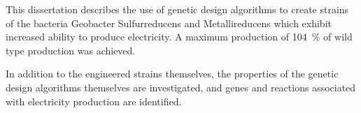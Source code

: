 This dissertation describes the use of genetic design algorithms to create strains of the bacteria Geobacter Sulfurreducens and Metallireducens which exhibit increased ability to produce electricity. 
A maximum production of \SI{104}{\percent} of wild type production was achieved.

In addition to the engineered strains themselves, the properties of the genetic design algorithms themselves are investigated, and genes and reactions associated with electricity production are identified.